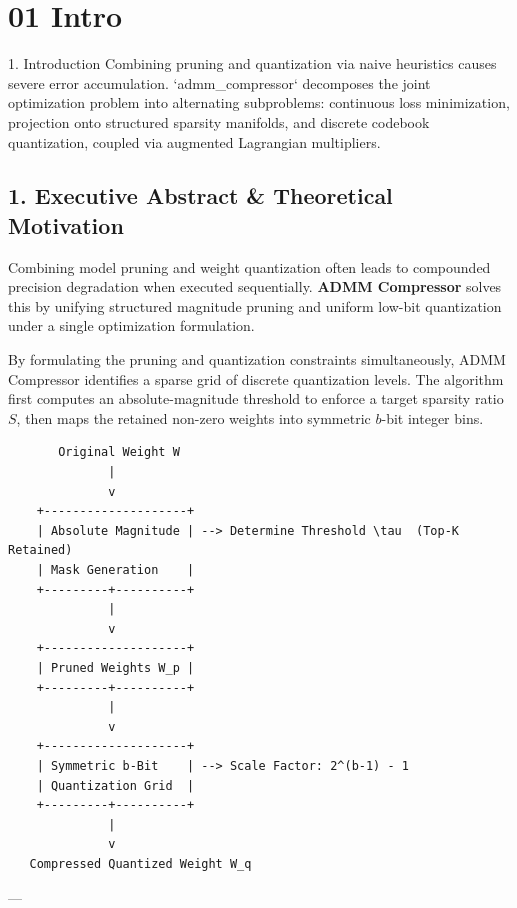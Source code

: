 \section{01 Intro}

 1. Introduction
Combining pruning and quantization via naive heuristics causes severe error accumulation. `admm\_compressor` decomposes the joint optimization problem into alternating subproblems: continuous loss minimization, projection onto structured sparsity manifolds, and discrete codebook quantization, coupled via augmented Lagrangian multipliers.



\subsection{1. Executive Abstract \& Theoretical Motivation}
Combining model pruning and weight quantization often leads to compounded precision degradation when executed sequentially. \textbf{ADMM Compressor} solves this by unifying structured magnitude pruning and uniform low-bit quantization under a single optimization formulation.

By formulating the pruning and quantization constraints simultaneously, ADMM Compressor identifies a sparse grid of discrete quantization levels. The algorithm first computes an absolute-magnitude threshold to enforce a target sparsity ratio $S$, then maps the retained non-zero weights into symmetric $b$-bit integer bins.


\begin{lstlisting}
       Original Weight W
              |
              v
    +--------------------+
    | Absolute Magnitude | --> Determine Threshold \tau  (Top-K Retained)
    | Mask Generation    |
    +---------+----------+
              |
              v
    +--------------------+
    | Pruned Weights W_p |
    +---------+----------+
              |
              v
    +--------------------+
    | Symmetric b-Bit    | --> Scale Factor: 2^(b-1) - 1
    | Quantization Grid  |
    +---------+----------+
              |
              v
   Compressed Quantized Weight W_q
\end{lstlisting}


---